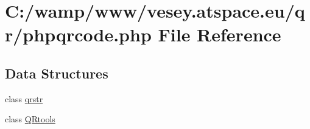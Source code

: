 \hypertarget{phpqrcode_8php}{\section{C\-:/wamp/www/vesey.atspace.\-eu/qr/phpqrcode.php File Reference}
\label{phpqrcode_8php}
}
\subsection*{Data Structures}
\begin{DoxyCompactItemize}
\item 
class \hyperlink{classqrstr}{qrstr}
\item 
class \hyperlink{class_q_rtools}{Q\-Rtools}
\end{DoxyCompactItemize}
